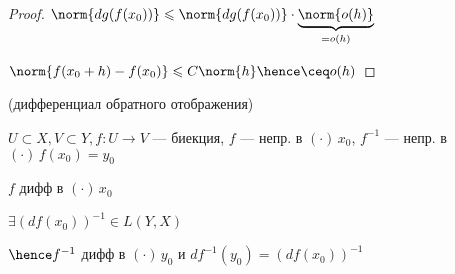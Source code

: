 \begin{properties}{}
\begin{proof}
        $\norm{dg(f(x_0))} \leqslant \norm{dg(f(x_0))} \cdot \underbrace{\norm{o(h)}}_{=o(h)}$

        $\norm{f(x_0 + h) - f(x_0)} \leqslant C \norm{h} \hence \ceq o(h)$
    \end{proof}

    \item (дифференциал обратного отображения)
    
    $U \subset X, V \subset Y, f : U \to V $ --- биекция, $f $ --- непр. в $(\cdot)\, x_0$, $f^{-1}$ --- непр. в $(\cdot)\, f(x_0) = y_0$ 

    $f$ дифф в $(\cdot) \, x_0$

    $\exists (df(x_0))^{-1} \in L(Y, X)$

    $\hence f^{-1}$ дифф в $(\cdot)\, y_0$ и $df^{-1}(y_0) = (df(x_0)) ^ {-1}$
\end{properties}
